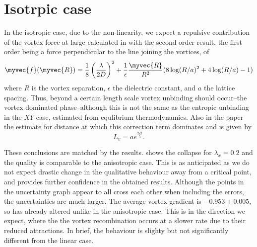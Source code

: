 \section{Isotrpic case}

In the isotropic case, due to the non-linearity, we expect a repulsive contribution of the vortex force at large calculated in \cite{PhysRevB.94.104520} with the second order result, the first order being a force perpendicular to the line joining the vortices, of 
\[
\myvec{f}(\myvec{R}) = \frac18 \left( \frac{\lambda}{2D}\right)^2 + \frac{1}{\epsilon} \frac{\myvec{R}}{R^2}(8\log(R/a)^2 + 4\log(R/a)-1)
\]
where $R$ is the vortex separation, $\epsilon$ the dielectric constant, and $a$ the lattice spacing. Thus, beyond a certain length scale vortex unbinding should occur--the vortex dominated phase--although this is not the same as the entropic unbinding in the $XY$ case, estimated from equlibrium thermodynamics. Also in the paper the estimate for distance at which this correction term dominates and is given by 
\[
L_v = ae^{\frac{2D}{\lambda}}.
\]

These conclusions are matched by the results. \fig{\ref{fig:binder_log_t_cL_0.20.2}} shows the collapse for $\lambda_x=0.2$ and the quality is comparable to the anisotropic case. This is as anticipated as we do not expect drastic change in the qualitative behaviour away from a critical point, and provides further confidence in the obtained results. Although the points in the uncertainty graph appear to all cross each other when including the errors, the uncertainties are much larger. The average vortex gradient is $-0.953 \pm 0.005$, so has already altered unlike in the anisotropic case. This is in the direction we expect, where the the vortex recombination occurs at a slower rate due to their reduced attractions. In brief, the behaviour is slighty but not significantly different from the linear case. 
 
